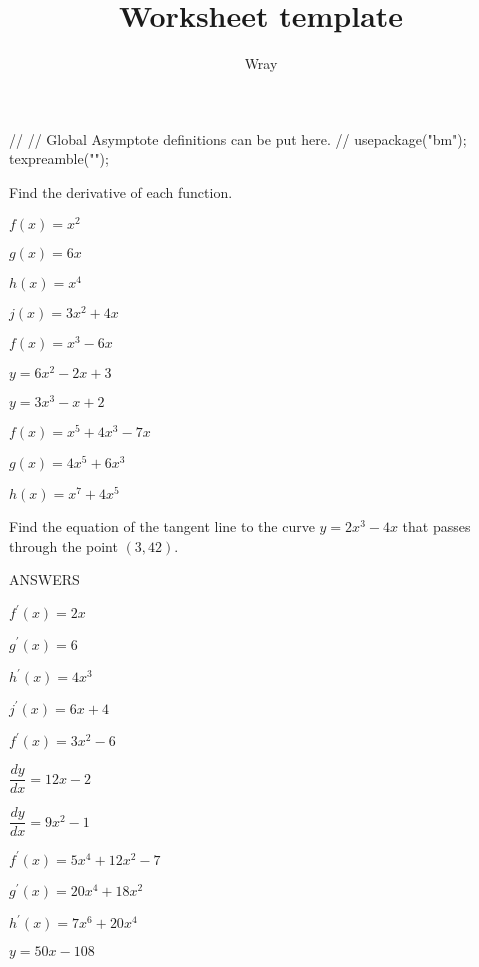\documentclass[addpoints, 12pt]{exam}
\title{Worksheet template}
\author{Wray}
\begin{document}
\begin{asydef}
//
// Global Asymptote definitions can be put here.
//
usepackage("bm");
texpreamble("\def\V#1{\bm{#1}}");
\end{asydef}


\bigskip

Find the derivative of each function.

\begin{questions}

\question
$f(x) = x^2$

\question
$g(x) = 6x$

\question
$h(x) = x^4$

\question
$j(x) = 3x^2 + 4x$

\question
$f(x) = x^3 - 6x$

\question
$y = 6x^2 - 2x + 3$

\question
$y = 3x^3 - x + 2$

\question
$f(x) = x^5 + 4x^3 - 7x$

\question
$g(x) = 4x^5 + 6x^3$

\question
$h(x) = x^7 + 4x^5$

\question
Find the equation of the tangent line to the curve $y = 2x^3 - 4x$ that passes through the point $(3, 42)$.

\end{questions}

\clearpage

ANSWERS

\bigskip

\begin{questions}

\question
$f^{\prime} (x) = 2x$

\question
$g^{\prime}(x) = 6$

\question
$h^{\prime}(x) = 4x^3$

\question
$j^{\prime}(x) = 6x + 4$

\question
$f^{\prime}(x) = 3x^2 - 6$

\question
$\dfrac{dy}{dx} = 12x - 2$

\question
$\dfrac{dy}{dx} = 9x^2 - 1$

\question
$f^{\prime}(x) = 5x^4 + 12x^2 - 7$

\question
$g^{\prime}(x) = 20x^4 + 18x^2$

\question
$h^{\prime}(x) = 7x^6 + 20x^4$

\question
$y = 50x - 108$

\end{questions}
\end{document}
